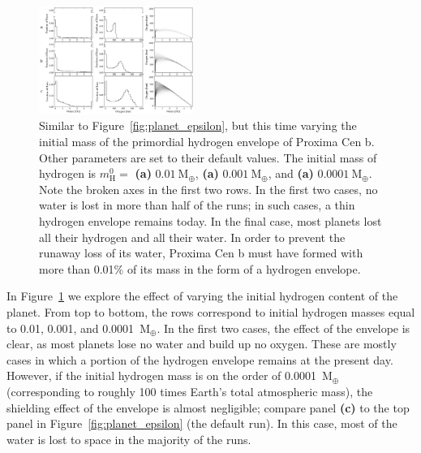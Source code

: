 \documentclass[]{emulateapj}
\begin{document}
\begin{figure}[hbt]
  \begin{center}
      \includegraphics[width=0.45\textwidth]{figures/planet_hydrogen.pdf}
       \caption{Similar to Figure~\ref{fig:planet_epsilon}, but this time varying the initial mass of the primordial
       hydrogen envelope of Proxima Cen b. Other parameters are set to their default values. The initial mass of hydrogen
       is $m_\mathrm{H}^0 =$ \textbf{(a)} $0.01\ \mathrm{M_\oplus}$, \textbf{(a)} $0.001\ \mathrm{M_\oplus}$, and
       \textbf{(a)} $0.0001\ \mathrm{M_\oplus}$. Note the broken axes in the first two rows. In the first two cases,
       no water is lost in more than half of the runs; in such cases, a thin hydrogen envelope remains today. In the
       final case, most planets lost all their hydrogen and all their water. In order to prevent the runaway loss
       of its water, Proxima Cen b must have formed with more than 0.01\% of its mass in the form of a hydrogen envelope.
       }
     \label{fig:planet_hydrogen}
  \end{center}
\end{figure}

In Figure~\ref{fig:planet_hydrogen} we explore the effect of varying the initial hydrogen content of the planet.
From top to bottom, the rows correspond to initial hydrogen masses equal to 0.01, 0.001, and 0.0001~$\mathrm{M_\oplus}$.
In the first two cases, the effect of the envelope is clear, as most planets lose no water and build up no oxygen.
These are mostly cases in which a portion of the hydrogen envelope remains at the present day. However, if the
initial hydrogen mass is on the order of 0.0001~$\mathrm{M_\oplus}$ (corresponding to roughly 100 times Earth's
total atmospheric mass), the shielding effect of the envelope is 
almost negligible; compare panel \textbf{(c)} to the top panel in Figure~\ref{fig:planet_epsilon} (the default run).
In this case, most of the water is lost to space in the majority of the runs.
\end{document}
